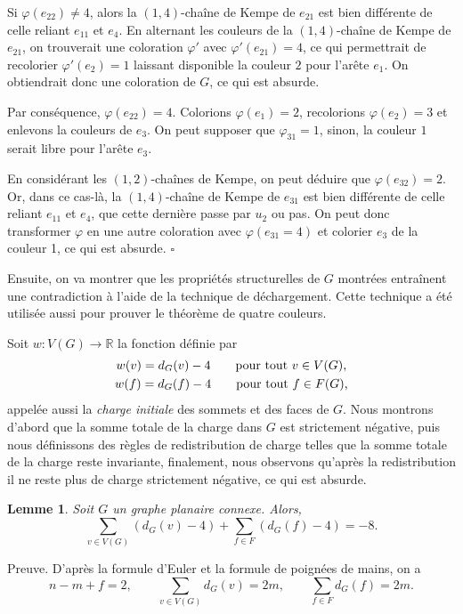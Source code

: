 \documentclass[10pt,a4paper]{article}
\newtheorem{lemme}{Lemme}
\newcommand{\ep}{{\hfill $\square$}}
\begin{document}
Si $\varphi(e_{22}) \ne 4$, alors la $(1,4)$-chaîne de Kempe de $e_{21}$ est bien différente de celle reliant $e_{11}$ et $e_4$. En alternant les couleurs de la $(1,4)$-chaîne de Kempe de $e_{21}$, on trouverait une coloration $\varphi'$ avec $\varphi'(e_{21})=4$, ce qui permettrait de recolorier $\varphi'(e_2) = 1$ laissant disponible la couleur $2$ pour l'arête $e_1$. On obtiendrait donc une coloration de $G$, ce qui est absurde. 

Par conséquence, $\varphi(e_{22}) = 4$. Colorions $\varphi(e_1)=2$, recolorions $\varphi(e_2)=3$ et enlevons la couleurs de $e_3$.
On peut supposer que $\varphi_{31}=1$, sinon, la couleur $1$ serait libre pour l'arête $e_3$.

En considérant les $(1,2)$-chaînes de Kempe, on peut déduire que $\varphi(e_{32})=2$. Or, dans ce cas-là, la $(1,4)$-chaîne de Kempe de $e_{31}$ est bien différente de celle reliant $e_{11}$ et $e_4$, que cette dernière passe par $u_2$ ou pas. On peut donc transformer $\varphi$ en une autre coloration avec $\varphi(e_{31}=4)$ et colorier $e_3$ de la couleur 1, ce qui est absurde.
\ep


\bigskip
Ensuite, on va montrer que les propriétés structurelles de $G$ montrées entraînent une contradiction à l'aide de la technique de déchargement. Cette technique a été utilisée aussi pour prouver le théorème de quatre couleurs. 

Soit $w: V(G) \to \mathbb{R}$  la fonction définie par
 $$
 \gathered
 w(v) = d_G(v) - 4 \qquad \textrm{pour tout $v\in V(G)$,} \\
 w(f) = d_G(f) - 4 \qquad \textrm{pour tout $f\in F(G)$,} 
\endgathered 
$$
appelée aussi la \emph{charge initiale} des sommets et des faces de $G$. Nous montrons d'abord que la somme totale de la charge dans $G$ est strictement négative, puis nous définissons des règles de redistribution de charge telles que la somme totale de la charge reste invariante, finalement, nous observons qu'après la redistribution il ne reste plus de charge strictement négative, ce qui est absurde.

\begin{lemme}
Soit $G$ un graphe planaire connexe. Alors,
$$ \sum_{v \in V(G)} (d_G(v) - 4) + \sum_{f\in F} (d_G(f) -4) = -8.$$
\label{le:charge}
\end{lemme}

Preuve.
D'après la formule d'Euler et la formule de poignées de mains, on a
$$ 
n - m + f = 2, \qquad
\sum_{v\in V(G)} d_G(v) = 2m, \qquad
\sum_{f\in F} d_G(f) = 2m. 
$$
\end{document}
